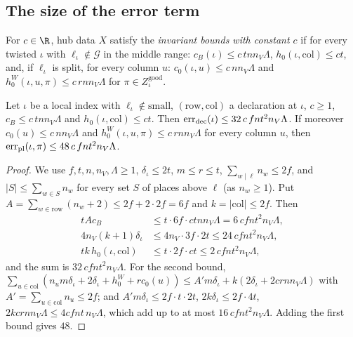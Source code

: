 \subsection{The size of the error term}\label{pf:linkN-adm:bbsec}

\begin{definition}\label{pf:linkN-adm:def-inv}
For $c\in\R$, hub data $X$ satisfy the \emph{invariant bounds with constant $c$} if for every twisted $\iota$ with
$\ell_\iota\notin\mathcal G$ in the middle range: $c_B(\iota)\le c\,tnn_V\Lambda$, $h_0(\iota,\mathrm{col})\le ct$, and, if
$\ell_\iota$ is split, for every column $u$: $c_0(\iota,u)\le c\,nn_V\Lambda$ and $h^W_0(\iota,u,\pi)\le c\,rnn_V\Lambda$ for
$\pi\in Z^{\mathrm{good}}_\iota$.
\end{definition}

\begin{lemma}\label{pf:linkN-adm:blk}
Let $\iota$ be a local index with $\ell_\iota\notin\mathrm{small}$, $(\mathrm{row},\mathrm{col})$ a declaration at $\iota$,
$c\ge1$, $c_B\le c\,tnn_V\Lambda$ and $h_0(\iota,\mathrm{col})\le ct$. Then $\operatorname{err}_{\mathrm{dec}}(\iota)\le
32\,c\,fnt^2n_V\Lambda$. If moreover $c_0(u)\le c\,nn_V\Lambda$ and $h^W_0(\iota,u,\pi)\le c\,rnn_V\Lambda$ for every column
$u$, then $\operatorname{err}_{\mathrm{pl}}(\iota,\pi)\le48\,c\,fnt^2n_V\Lambda$.
\end{lemma}

\begin{proof}
We use $f,t,n,n_V,\Lambda\ge1$, $\delta_\iota\le2t$, $m\le r\le t$, $\sum_{w\mid\ell}n_w\le2f$, and $|S|\le\sum_{w\in S}n_w$
for every set $S$ of places above $\ell$ (as $n_w\ge1$). Put $A=\sum_{w\in\mathrm{row}}(n_w+2)\le2f+2\cdot2f=6f$ and
$k=|\mathrm{col}|\le2f$. Then
\begin{align*}
tAc_B&\le t\cdot6f\cdot ctnn_V\Lambda=6\,cfnt^2n_V\Lambda,\\
4n_V(k+1)\delta_\iota&\le4n_V\cdot3f\cdot2t\le24\,cfnt^2n_V\Lambda,\\
tk\,h_0(\iota,\mathrm{col})&\le t\cdot2f\cdot ct\le2\,cfnt^2n_V\Lambda,
\end{align*}
and the sum is $32\,cfnt^2n_V\Lambda$. For the second bound, $\sum_{u\in\mathrm{col}}(n_um\delta_\iota+2\delta_\iota+h^W_0+rc_0(u))
\le A'm\delta_\iota+k(2\delta_\iota+2crnn_V\Lambda)$ with $A'=\sum_{u\in\mathrm{col}}n_u\le2f$; and $A'm\delta_\iota\le
2f\cdot t\cdot2t$, $2k\delta_\iota\le2f\cdot4t$, $2kcrnn_V\Lambda\le4cfnt\,n_V\Lambda$, which add up to at most
$16\,cfnt^2n_V\Lambda$. Adding the first bound gives $48$.
\end{proof}

